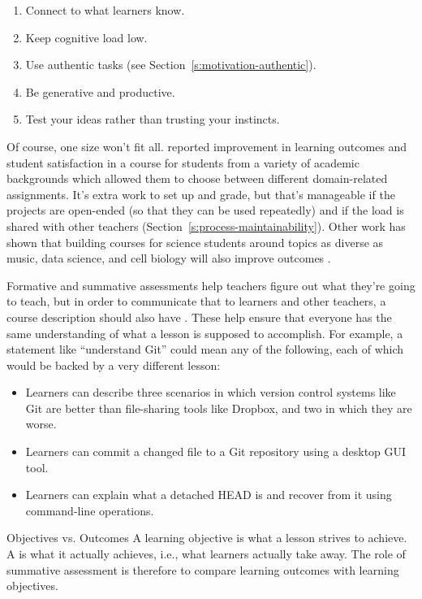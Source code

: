 \begin{enumerate}
\item
  Connect to what learners know.
\item
  Keep cognitive load low.
\item
  Use authentic tasks (see Section~\ref{s:motivation-authentic}).
\item
  Be generative and productive.
\item
  Test your ideas rather than trusting your instincts.
\end{enumerate}

Of course, one size won't fit all. \cite{Alha2018} reported
improvement in learning outcomes and student satisfaction in a course
for students from a variety of academic backgrounds which allowed them
to choose between different domain-related assignments. It's extra
work to set up and grade, but that's manageable if the projects are
open-ended (so that they can be used repeatedly) and if the load is
shared with other teachers (Section~\ref{s:process-maintainability}).
Other work has shown that building courses for science students around
topics as diverse as music, data science, and cell biology will also
improve outcomes
\cite{Pete2017,Dahl2018,Ritz2018}.


Formative and summative assessments help teachers figure out what
they're going to teach, but in order to communicate that to learners
and other teachers, a course description should also have . These help ensure that
everyone has the same understanding of what a lesson is supposed to
accomplish. For example, a statement like ``understand Git'' could mean
any of the following, each of which would be backed by a very
different lesson:

\begin{itemize}
\item
  Learners can describe three scenarios in which version control
  systems like Git are better than file-sharing tools like Dropbox,
  and two in which they are worse.
\item
  Learners can commit a changed file to a Git repository using a
  desktop GUI tool.
\item
  Learners can explain what a detached HEAD is and recover from it
  using command-line operations.
\end{itemize}

\begin{aside}{Objectives vs. Outcomes}
  A learning objective is what a lesson strives to achieve. A
   is what it actually
  achieves, i.e., what learners actually take away. The role of
  summative assessment is therefore to compare learning outcomes with
  learning objectives.
\end{aside}

